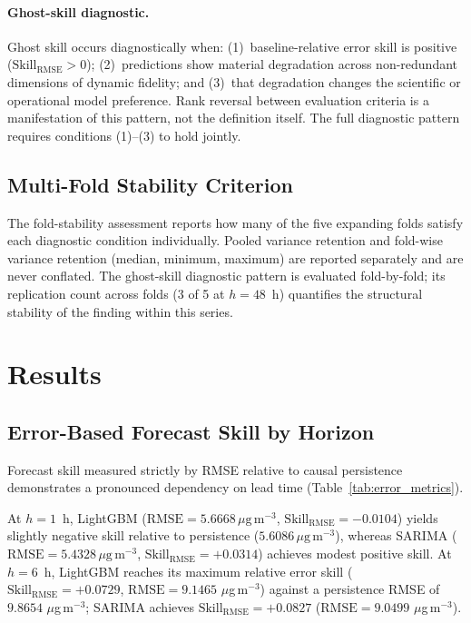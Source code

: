 \documentclass[12pt]{article}
\begin{document}
\paragraph{Ghost-skill diagnostic.}
Ghost skill occurs diagnostically when: (1)~baseline-relative error skill is positive ($\mathrm{Skill}_\mathrm{RMSE} > 0$); (2)~predictions show material degradation across non-redundant dimensions of dynamic fidelity; and (3)~that degradation changes the scientific or operational model preference. Rank reversal between evaluation criteria is a manifestation of this pattern, not the definition itself. The full diagnostic pattern requires conditions (1)--(3) to hold jointly.

\subsection{Multi-Fold Stability Criterion}
\label{sec:fold_stability}

The fold-stability assessment reports how many of the five expanding folds satisfy each diagnostic condition individually. Pooled variance retention and fold-wise variance retention (median, minimum, maximum) are reported separately and are never conflated. The ghost-skill diagnostic pattern is evaluated fold-by-fold; its replication count across folds (3 of 5 at $h = 48$~h) quantifies the structural stability of the finding within this series.

\section{Results}
\label{sec:results}

\subsection{Error-Based Forecast Skill by Horizon}
\label{sec:results_error_skill}

Forecast skill measured strictly by RMSE relative to causal persistence demonstrates a pronounced dependency on lead time (Table~\ref{tab:error_metrics}).

At $h = 1$~h, LightGBM ($\mathrm{RMSE} = 5.6668\,\mu\mathrm{g\,m}^{-3}$, $\mathrm{Skill}_\mathrm{RMSE} = -0.0104$) yields slightly negative skill relative to persistence ($5.6086\,\mu\mathrm{g\,m}^{-3}$), whereas SARIMA ($\mathrm{RMSE} = 5.4328\,\mu\mathrm{g\,m}^{-3}$, $\mathrm{Skill}_\mathrm{RMSE} = +0.0314$) achieves modest positive skill.
At $h = 6$~h, LightGBM reaches its maximum relative error skill ($\mathrm{Skill}_\mathrm{RMSE} = +0.0729$, $\mathrm{RMSE} = 9.1465$ $\mu$g\,m$^{-3}$) against a persistence RMSE of $9.8654$ $\mu$g\,m$^{-3}$; SARIMA achieves $\mathrm{Skill}_\mathrm{RMSE} = +0.0827$ ($\mathrm{RMSE} = 9.0499$ $\mu$g\,m$^{-3}$).
\end{document}
